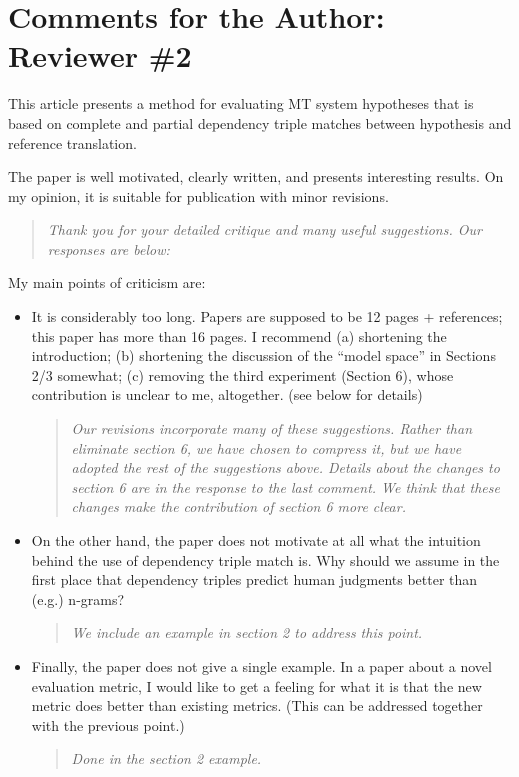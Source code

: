 \documentclass[letterpaper,12pt]{article}
\newenvironment{response}
{\begin{quotation} \it}
  {\end{quotation}}
\begin{document}
\section{Comments for the Author: Reviewer \#2}
\label{sec:reviewer2}

This article presents a method for evaluating MT system hypotheses
that is based on complete and partial dependency triple matches
between hypothesis and reference translation.

The paper is well motivated, clearly written, and presents interesting
results. On my opinion, it is suitable for publication with minor
revisions. 
\begin{response}
  Thank you for your detailed critique and many useful
  suggestions. Our responses are below:
\end{response}
My main points of criticism are:

\begin{itemize}
\item It is considerably too long. Papers are supposed to be 12 pages
  + references; this paper has more than 16 pages. I recommend (a)
  shortening the introduction; (b) shortening the discussion of the
  ``model space'' in Sections 2/3 somewhat; (c) removing the third
  experiment (Section 6), whose contribution is unclear to me,
  altogether. (see below for details)
  \begin{response}
    Our revisions incorporate many of these suggestions. Rather than
    eliminate section 6, we have chosen to compress it, but we have
    adopted the rest of the suggestions above.  Details about the 
    changes to section 6 are in the response to the last comment.  We think that these 
    changes make the contribution
    of section 6 more clear.
  \end{response}

\item On the other hand, the paper does not motivate at all what the
  intuition behind the use of dependency triple match is. Why should
  we assume in the first place that dependency triples predict human
  judgments better than (e.g.) n-grams?
  \begin{response}
    We include an example in section 2 to address this point. 
  \end{response}

\item Finally, the paper does not give a single example. In a paper
  about a novel evaluation metric, I would like to get a feeling for
  what it is that the new metric does better than existing
  metrics. (This can be addressed together with the previous point.)
  \begin{response}
    Done in the section 2 example.
  \end{response}
\end{itemize}
\end{document}
